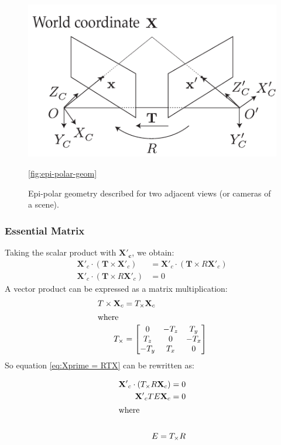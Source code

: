 \begin{figure}
  \centering
  \includegraphics{Chapters/flopt/Figs/PDF/epi-polar-geom}
  \caption{Epi-polar geometry described for two adjacent views (or cameras of a scene).}
  \ref{fig:epi-polar-geom}
\end{figure}

\subsubsection{Essential Matrix}

Taking the scalar product with $\mathbf{X'_c}$, we obtain:
\begin{align}
    \mathbf{X'}_c \cdot (\mathbf{T} \times \mathbf{X'}_c) &= \mathbf{X'}_c\cdot (\mathbf{T} \times R\mathbf{X'}_c)\nonumber \\
    \mathbf{X'}_c \cdot (\mathbf{T} \times R\mathbf{X'}_c) &= 0 \nonumber
\end{align}
A vector product can be expressed as a matrix multiplication:
\begin{align}
T \times \mathbf{X}_c &= T_\times \mathbf{X}_c \\
\intertext{where}
T_\times &=\begin{bmatrix}
0    & -T_z  & T_y\\
T_z  & 0     & -T_x\\
-T_y  & T_x   & 0
\end{bmatrix}
\end{align}
So equation \eqref{eq:Xprime = RTX} can be rewritten as:

\begin{align}
\mathbf{X'}_c \cdot (T_\times R\mathbf{X}_c) = 0 \nonumber\\
\mathbf{X'}_c T E \mathbf{X}_c = 0  \nonumber\\
\intertext{where}  \nonumber\\
E = T_\times R \nonumber
\end{align}

